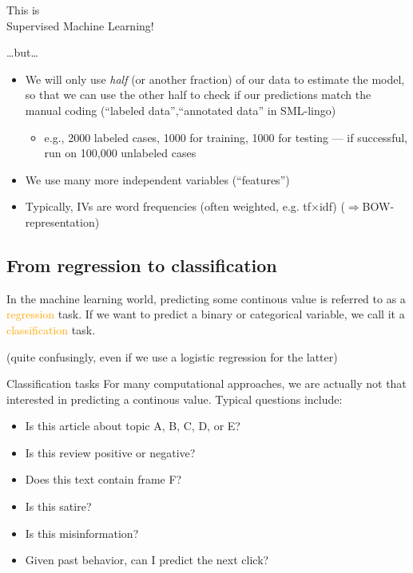 \documentclass[handout]{beamer}
\begin{document}
\begin{frame}{}
\huge{This is\\ Supervised Machine Learning!}
\end{frame}

\begin{frame}{\ldots but\ldots}
\begin{itemize}
\item<1-> We will only use \emph{half} {\tiny{(or another fraction)}} of our data to estimate the model, so that we can use the other half to check if our predictions match the manual coding (``labeled data'',``annotated data'' in SML-lingo)
\begin{itemize}
\item<2->e.g., 2000 labeled cases, 1000 for training, 1000 for testing --- if successful, run on 100,000 unlabeled cases
\end{itemize}
\item<3-> We use many more independent variables (``features'')
\item<4-> Typically, IVs are word frequencies (often weighted, e.g. tf$\times$idf) ($\Rightarrow$BOW-representation)
\end{itemize}
\end{frame}


\subsection{From regression to classification}

\begin{frame}[standout]
In the machine learning world, predicting some continous value is referred to as a \textcolor{orange}{regression} task. If we want to predict a binary or categorical variable, we call it a \textcolor{orange}{classification} task.

(quite confusingly, even if we use a logistic regression for the latter)
\end{frame}


\begin{frame}{Classification tasks}
For many computational approaches, we are actually not that interested in predicting a continous value. Typical questions include:
\begin{itemize}
\item Is this article about topic A, B, C, D, or E?
\item Is this review positive or negative?
\item Does this text contain frame F?
\item Is this satire? 
\item Is this misinformation?
\item Given past behavior, can I predict the next click?
\end{itemize}
\end{frame}
\end{document}
